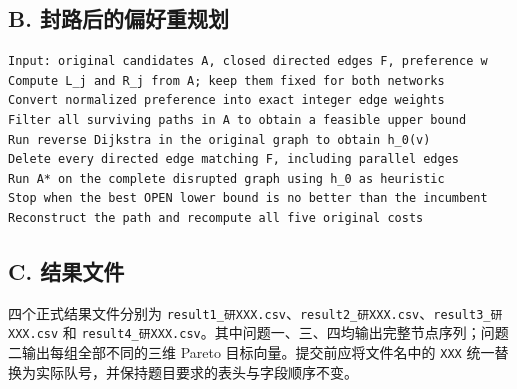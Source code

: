 \documentclass[UTF8,a4paper]{ctexart}
\begin{document}
\subsection*{B. 封路后的偏好重规划}
\begin{lstlisting}[language={}]
Input: original candidates A, closed directed edges F, preference w
Compute L_j and R_j from A; keep them fixed for both networks
Convert normalized preference into exact integer edge weights
Filter all surviving paths in A to obtain a feasible upper bound
Run reverse Dijkstra in the original graph to obtain h_0(v)
Delete every directed edge matching F, including parallel edges
Run A* on the complete disrupted graph using h_0 as heuristic
Stop when the best OPEN lower bound is no better than the incumbent
Reconstruct the path and recompute all five original costs
\end{lstlisting}

\subsection*{C. 结果文件}

四个正式结果文件分别为 \texttt{result1\_研XXX.csv}、\texttt{result2\_研XXX.csv}、\texttt{result3\_研XXX.csv} 和 \texttt{result4\_研XXX.csv}。其中问题一、三、四均输出完整节点序列；问题二输出每组全部不同的三维 Pareto 目标向量。提交前应将文件名中的 \texttt{XXX} 统一替换为实际队号，并保持题目要求的表头与字段顺序不变。
\end{document}
